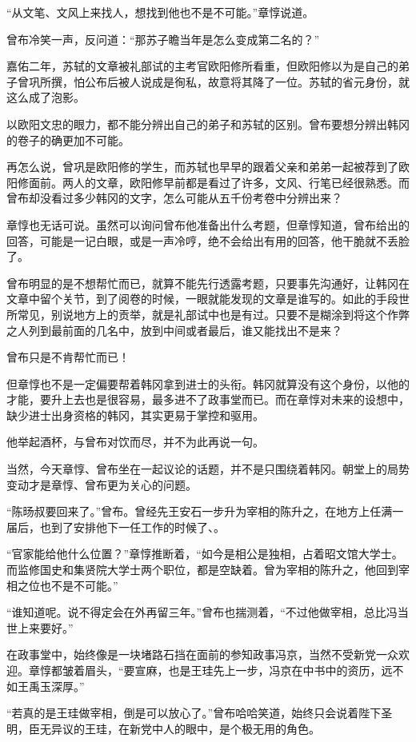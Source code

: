 “从文笔、文风上来找人，想找到他也不是不可能。”章惇说道。

曾布冷笑一声，反问道：“那苏子瞻当年是怎么变成第二名的？”

嘉佑二年，苏轼的文章被礼部试的主考官欧阳修所看重，但欧阳修以为是自己的弟子曾巩所撰，怕公布后被人说成是徇私，故意将其降了一位。苏轼的省元身份，就这么成了泡影。

以欧阳文忠的眼力，都不能分辨出自己的弟子和苏轼的区别。曾布要想分辨出韩冈的卷子的确更加不可能。

再怎么说，曾巩是欧阳修的学生，而苏轼也早早的跟着父亲和弟弟一起被荐到了欧阳修面前。两人的文章，欧阳修早前都是看过了许多，文风、行笔已经很熟悉。而曾布却没看过多少韩冈的文字，怎么可能从五千份考卷中分辨出来？

章惇也无话可说。虽然可以询问曾布他准备出什么考题，但章惇知道，曾布给出的回答，可能是一记白眼，或是一声冷哼，绝不会给出有用的回答，他干脆就不丢脸了。

曾布明显的是不想帮忙而已，就算不能先行透露考题，只要事先沟通好，让韩冈在文章中留个关节，到了阅卷的时候，一眼就能发现的文章是谁写的。如此的手段世所常见，别说地方上的贡举，就是礼部试中也是有过。只要不是糊涂到将这个作弊之人列到最前面的几名中，放到中间或者最后，谁又能找出不是来？

曾布只是不肯帮忙而已！

但章惇也不是一定偏要帮着韩冈拿到进士的头衔。韩冈就算没有这个身份，以他的才能，要升上去也是很容易，最多进不了政事堂而已。而在章惇对未来的设想中，缺少进士出身资格的韩冈，其实更易于掌控和驱用。

他举起酒杯，与曾布对饮而尽，并不为此再说一句。

当然，今天章惇、曾布坐在一起议论的话题，并不是只围绕着韩冈。朝堂上的局势变动才是章惇、曾布更为关心的问题。

“陈旸叔要回来了。”曾布。曾经先王安石一步升为宰相的陈升之，在地方上任满一届后，也到了安排他下一任工作的时候了、。

“官家能给他什么位置？”章惇推断着，“如今是相公是独相，占着昭文馆大学士。而监修国史和集贤院大学士两个职位，都是空缺着。曾为宰相的陈升之，他回到宰相之位也不是不可能。”

“谁知道呢。说不得定会在外再留三年。”曾布也揣测着，“不过他做宰相，总比冯当世上来要好。”

在政事堂中，始终像是一块堵路石挡在面前的参知政事冯京，当然不受新党一众欢迎。章惇都皱着眉头，“要宣麻，也是王珪先上一步，冯京在中书中的资历，远不如王禹玉深厚。”

“若真的是王珪做宰相，倒是可以放心了。”曾布哈哈笑道，始终只会说着陛下圣明，臣无异议的王珪，在新党中人的眼中，是个极无用的角色。

